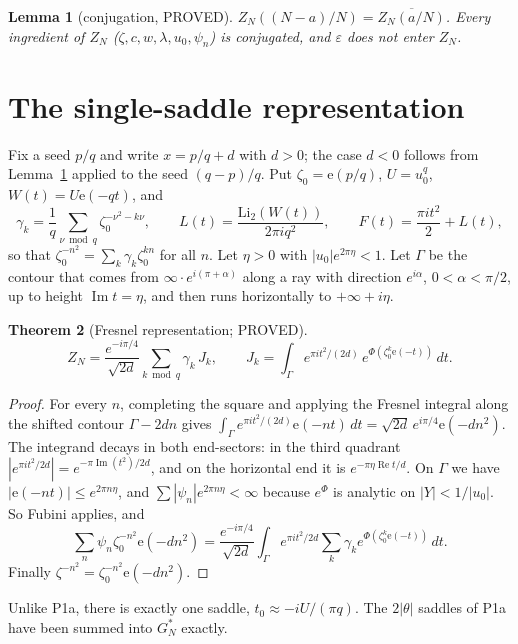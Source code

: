 \documentclass[11pt]{article}
\newtheorem{theorem}{Theorem}\newtheorem{lemma}[theorem]{Lemma}\newtheorem{proposition}[theorem]{Proposition}
\theoremstyle{definition}\newtheorem{definition}[theorem]{Definition}
\theoremstyle{remark}\newtheorem{remark}[theorem]{Remark}
\newcommand{\e}{\mathrm{e}}
\begin{document}
\begin{lemma}[conjugation, PROVED]\label{lem:conj}
$Z_N((N-a)/N)=\overline{Z_N(a/N)}$. Every ingredient of $Z_N$ ($\zeta,c,w,\lambda,u_0,\psi_n$) is conjugated, and $\varepsilon$ does not enter $Z_N$.
\end{lemma}

\section{The single-saddle representation}
Fix a seed $p/q$ and write $x=p/q+d$ with $d>0$; the case $d<0$ follows from Lemma~\ref{lem:conj} applied to the seed $(q-p)/q$.
Put $\zeta_0=\e(p/q)$, $U=u_0^q$, $W(t)=U\e(-qt)$, and
\[\gamma_k=\frac1q\sum_{\nu\bmod q}\zeta_0^{-\nu^2-k\nu},\qquad L(t)=\frac{\mathrm{Li}_2(W(t))}{2\pi i q^2},\qquad F(t)=\frac{\pi i t^2}2+L(t),\]
so that $\zeta_0^{-n^2}=\sum_k\gamma_k\zeta_0^{kn}$ for all $n$.
Let $\eta>0$ with $|u_0|e^{2\pi\eta}<1$.
Let $\Gamma$ be the contour that comes from $\infty\cdot e^{i(\pi+\alpha)}$ along a ray with direction $e^{i\alpha}$, $0<\alpha<\pi/2$, up to height $\operatorname{Im}t=\eta$, and then runs horizontally to $+\infty+i\eta$.

\begin{theorem}[Fresnel representation; PROVED]\label{thm:fresnel}
\[Z_N=\frac{e^{-i\pi/4}}{\sqrt{2d}}\sum_{k\bmod q}\gamma_k\,J_k,\qquad J_k=\int_\Gamma e^{\pi i t^2/(2d)}\,e^{\Phi(\zeta_0^k\e(-t))}\,dt.\]
\end{theorem}
\begin{proof}
For every $n$, completing the square and applying the Fresnel integral along the shifted contour $\Gamma-2dn$ gives $\int_\Gamma e^{\pi it^2/(2d)}\e(-nt)\,dt=\sqrt{2d}\,e^{i\pi/4}\e(-dn^2)$. The integrand decays in both end-sectors: in the third quadrant $|e^{\pi i t^2/2d}|=e^{-\pi\operatorname{Im}(t^2)/2d}$, and on the horizontal end it is $e^{-\pi\eta\operatorname{Re}t/d}$.
On $\Gamma$ we have $|\e(-nt)|\le e^{2\pi n\eta}$, and $\sum|\psi_n|e^{2\pi n\eta}<\infty$ because $e^\Phi$ is analytic on $|Y|<1/|u_0|$. So Fubini applies, and
\[\sum_n\psi_n\zeta_0^{-n^2}\e(-dn^2)=\frac{e^{-i\pi/4}}{\sqrt{2d}}\int_\Gamma e^{\pi it^2/2d}\sum_k\gamma_k e^{\Phi(\zeta_0^k\e(-t))}\,dt.\]
Finally $\zeta^{-n^2}=\zeta_0^{-n^2}\e(-dn^2)$.
\end{proof}
Unlike P1a, there is exactly one saddle, $t_0\approx -iU/(\pi q)$. The $2|\theta|$ saddles of P1a have been summed into $G^*_N$ exactly.
\end{document}
